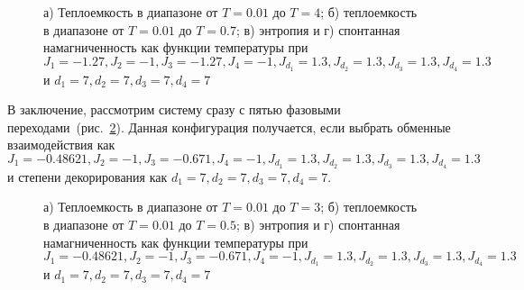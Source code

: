  \begin{figure}[h]
	\begin{minipage}{0.47\linewidth}
	\end{minipage}
	\hfill
	\begin{minipage}{0.47\linewidth}
	\end{minipage}
	\vfill
	\begin{minipage}{0.47\linewidth}
	\end{minipage}
	\hfill
	\begin{minipage}{0.47\linewidth}
	\end{minipage}
	\caption{а) Теплоемкость в диапазоне от $T=0.01$ до $T=4$; б) теплоемкость в диапазоне от $T=0.01$ до $T=0.7$; в) энтропия и г) спонтанная намагниченность как функции температуры при $J_1 = -1.27, J_2 = -1, J_3 = -1.27, J_4 = -1, J_{d_1} = 1.3, J_{d_2} = 1.3, J_{d_3} = 1.3, J_{d_4} = 1.3$ и $d_1 = 7, d_2 = 7, d_3 = 7, d_4 = 7$}
	\label{3trans}
\end{figure}

В заключение, рассмотрим систему сразу с пятью фазовыми переходами~(рис.~\ref{5trans}). Данная конфигурация получается, если выбрать обменные взаимодействия как $J_1 = -0.48621, J_2 = -1, J_3 = -0.671, J_4 = -1, J_{d_1} = 1.3, J_{d_2} = 1.3, J_{d_3} = 1.3, J_{d_4} = 1.3$ и степени декорирования как $d_1 = 7, d_2 = 7, d_3 = 7, d_4 = 7$. 

 \begin{figure}[h]
	\begin{minipage}{0.47\linewidth}
	\end{minipage}
	\hfill
	\begin{minipage}{0.47\linewidth}
	\end{minipage}
		\vfill
	\begin{minipage}{0.47\linewidth}
	\end{minipage}
	\hfill
	\begin{minipage}{0.47\linewidth}
	\end{minipage}
	\caption{а) Теплоемкость в диапазоне от $T=0.01$ до $T=3$; б) теплоемкость в диапазоне от $T=0.01$ до $T=0.5$; в) энтропия и г) спонтанная намагниченность как функции температуры при $J_1 = -0.48621, J_2 = -1, J_3 = -0.671, J_4 = -1, J_{d_1} = 1.3, J_{d_2} = 1.3, J_{d_3} = 1.3, J_{d_4} = 1.3$ и $d_1 = 7, d_2 = 7, d_3 = 7, d_4 = 7$}
	\label{5trans}
\end{figure}

